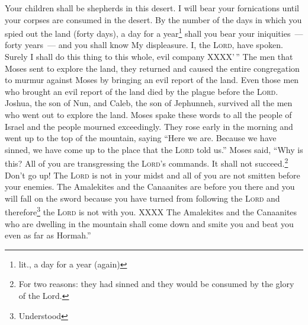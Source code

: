\begin{enumerate}[align=center]
     Your children shall be shepherds in this desert. I will bear your fornications until your corpses are consumed in the desert.%
     By the number of the days in which you spied out the land (forty days), a day for a year\footnote{lit., a day for a year (again)} shall you bear your iniquities~--- forty years~--- and you shall know My displeasure.%
     I, the \textsc{Lord}, have spoken. Surely I shall do this thing to this whole, evil company XXXX'\,''%
     The men that Moses sent to explore the land, they returned and caused the entire congregation to murmur against Moses by bringing an evil report of the land.%
     Even those men who brought an evil report of the land died by the plague before the \textsc{Lord}.%
     Joshua, the son of Nun, and Caleb, the son of Jephunneh, survived all the men who went out to explore the land.%
     Moses spake these words to all the people of Israel and the people mourned exceedingly.%
     They rose early in the morning and went up to the top of the mountain, saying ``Here we are. Because we have sinned, we have come up to the place that the \textsc{Lord} told us.''%
     Moses said, ``Why is this? All of you are transgressing the \textsc{Lord}'s commands. It shall not succeed.\footnote{For two reasons: they had sinned and they would be consumed by the glory of the Lord.}%
     Don't go up! The \textsc{Lord} is not in your midst and all of you are not smitten before your enemies.%
     The Amalekites and the Canaanites are before you there and you will fall on the sword because you have turned from following the \textsc{Lord} and therefore\footnote{Understood} the \textsc{Lord} is not with you.%
     XXXX%
     The Amalekites and the Canaanites who are dwelling in the mountain shall come down and smite you and beat you even as far as Hormah.''%
\end{enumerate}
